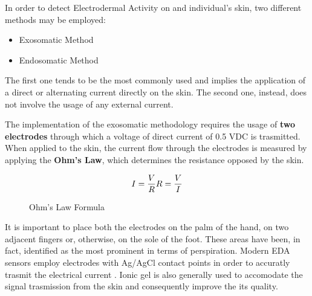 In order to detect Electrodermal Activity on and individual's skin, two different methods may be employed:

\begin{itemize}
    \item Exosomatic Method
    \item Endosomatic Method
\end{itemize}

The first one tends to be the most commonly used and implies the application of a direct or alternating current directly on the skin. The second one, instead, does not involve the usage of any external current.

The implementation of the exosomatic methodology requires the usage of \textbf{two electrodes} through which a voltage of direct current of 0.5 VDC is trasmitted. When applied to the skin, the current flow through the electrodes is measured by applying the \textbf{Ohm's Law}, which determines the resistance opposed by the skin.

\begin{figure}[h]
    \begin{equation}
    I = \frac{V}{R}
    \newline
    R = \frac{V}{I}
    \end{equation}
    \caption{Ohm's Law Formula}
    \label{fig:ohmlaw}
\end{figure}

It is important to place both the electrodes on the palm of the hand, on two adjacent fingers or, otherwise, on the sole of the foot. These areas have been, in fact, identified as the most prominent in terms of perspiration. Modern EDA sensors employ electrodes with Ag/AgCl contact points in order to accuratly trasmit the electrical current \cite{eda-imotions}. Ionic gel is also generally used to accomodate the signal trasmission from the skin and consequently improve the its quality.



